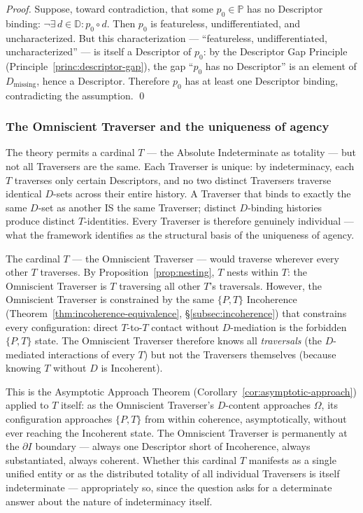 \documentclass[11pt,a4paper]{article}
\theoremstyle{definition}
\theoremstyle{remark}
\begin{document}
\begin{proof}
Suppose, toward contradiction, that some $p_{0} \in \mathbb{P}$ has no Descriptor binding: $\neg\exists\, d \in \mathbb{D} : p_{0} \circ d$. Then $p_{0}$ is featureless, undifferentiated, and uncharacterized. But this characterization --- ``featureless, undifferentiated, uncharacterized'' --- is itself a Descriptor of $p_{0}$: by the Descriptor Gap Principle (Principle~\ref{princ:descriptor-gap}), the gap ``$p_{0}$ has no Descriptor'' is an element of $D_{\mathrm{missing}}$, hence a Descriptor. Therefore $p_{0}$ has at least one Descriptor binding, contradicting the assumption. \qed
\end{proof}

\subsubsection{The Omniscient Traverser and the uniqueness of agency}\label{subsubsec:omniscient-T}

The theory permits a cardinal $T$ --- the Absolute Indeterminate as totality --- but not all Traversers are the same. Each Traverser is unique: by indeterminacy, each $T$ traverses only certain Descriptors, and no two distinct Traversers traverse identical $D$-sets across their entire history. A Traverser that binds to exactly the same $D$-set as another IS the same Traverser; distinct $D$-binding histories produce distinct $T$-identities. Every Traverser is therefore genuinely individual --- what the framework identifies as the structural basis of the uniqueness of agency.

The cardinal $T$ --- the Omniscient Traverser --- would traverse wherever every other $T$ traverses. By Proposition~\ref{prop:nesting}, $T$ nests within $T$: the Omniscient Traverser is $T$ traversing all other $T$'s traversals. However, the Omniscient Traverser is constrained by the same $\{P,T\}$ Incoherence (Theorem~\ref{thm:incoherence-equivalence}, \S\ref{subsec:incoherence}) that constrains every configuration: direct $T$-to-$T$ contact without $D$-mediation is the forbidden $\{P,T\}$ state. The Omniscient Traverser therefore knows all \emph{traversals} (the $D$-mediated interactions of every $T$) but not the Traversers themselves (because knowing $T$ without $D$ is Incoherent).

This is the Asymptotic Approach Theorem (Corollary~\ref{cor:asymptotic-approach}) applied to $T$ itself: as the Omniscient Traverser's $D$-content approaches $\Omega$, its configuration approaches $\{P,T\}$ from within coherence, asymptotically, without ever reaching the Incoherent state. The Omniscient Traverser is permanently at the $\partial I$ boundary --- always one Descriptor short of Incoherence, always substantiated, always coherent. Whether this cardinal $T$ manifests as a single unified entity or as the distributed totality of all individual Traversers is itself indeterminate --- appropriately so, since the question asks for a determinate answer about the nature of indeterminacy itself.
\end{document}
